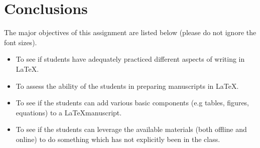 \documentclass[14pt, a4paper]{article} %
\begin{document}
    \section{Conclusions}
    The major objectives of this assignment are listed below (please do not ignore the font sizes).
    \begin{itemize}
     \item{\Huge{To see if students have adequately practiced different aspects of writing in \LaTeX.}} \pagebreak
     \item{\LARGE{To assess the ability of the students in preparing manuscripts in \LaTeX.}}
     \item{{To see if the students can add various basic components (e.g tables, figures, equations) to a \LaTeX manuscript.}}
     \item{To see if the students can leverage the available materials (both offline and online) to do something which has not explicitly been in the class.}
    \end{itemize}
\end{document}
